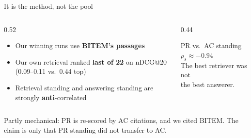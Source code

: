 \documentclass[aspectratio=169,11pt]{beamer}
\newcommand{\hl}[1]{{\color{accent}\textbf{#1}}}
\begin{document}
\begin{frame}{It is the method, not the pool}
\begin{columns}[T]
\begin{column}{0.52\textwidth}
\begin{itemize}\setlength\itemsep{0.6em}
  \item Our winning runs use \hl{BITEM's passages}
  \item Our own retrieval ranked \hl{last of 22} on nDCG@20
        \;(0.09--0.11 vs.\ 0.44 top)
  \item Retrieval standing and answering standing are strongly
        \textbf{anti}-correlated
\end{itemize}
\end{column}
\begin{column}{0.44\textwidth}
\centering
\begin{block}{PR vs.\ AC standing}
\centering
{\fontsize{30}{36}\selectfont\bfseries\color{accent}$\rho_s \approx -0.94$}\\[0.4em]
The best retriever was not\\the best answerer.
\end{block}
\end{column}
\end{columns}
\vspace{0.6em}
{\small Partly mechanical: PR is re-scored by AC citations, and we cited BITEM.
The claim is only that PR standing did not transfer to AC.\par}
\vspace{0.3em}
\end{frame}
\end{document}
